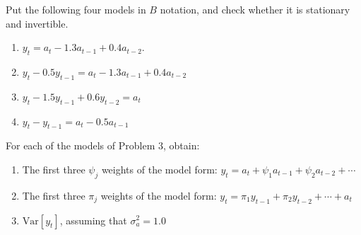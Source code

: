 \documentclass[UTF8,a4paper,14pt]{ctexart}
\newcommand{\Var}{\mathrm{Var}}
\theoremstyle{definition}
\theoremstyle{remark}
\begin{document}
\pagebreak
\begin{Problem}{}
    Put the following four models in \(B\) notation, and check whether it is stationary and invertible.
    \begin{enumerate}
        \item \(y_{t} = a_{t} - 1.3 a_{t-1} + 0.4 a_{t-2}\).
        \item \(y_{t} - 0.5 y_{t-1} = a_{t} - 1.3 a_{t-1} +0.4 a_{t-2}\)
        \item \(y_{t} - 1.5 y_{t-1} + 0.6 y_{t-2}= a_{t} \)
        \item \(y_{t} - y_{t-1} = a_{t} - 0.5 a_{t-1} \)
    \end{enumerate}
  \end{Problem}
  \begin{Problem}{}
    For each of the models of Problem 3, obtain:
    \begin{enumerate}[label=(\alph*)]
      \item The first three \(\psi_{j}\) weights of the model form: \(y_{t} = a_{t}+\psi_{1}a_{t-1}+\psi_{2}a_{t-2}+\cdots\)
      \item The first three \(\pi_{j}\) weights of the model form: \(y_{t} = \pi_{1}y_{t-1}+\pi_{2}y_{t-2}+\cdots+a_{t}\) 
      \item \(\Var[y_t]\), assuming that \(\sigma_{a}^2 = 1.0\) 
    \end{enumerate}
    \end{Problem}
\end{document}
